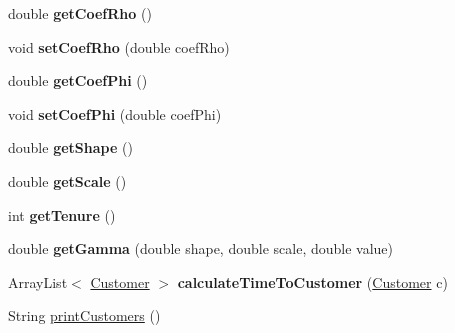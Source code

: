 \begin{DoxyCompactItemize}
\item 
double {\bfseries get\+Coef\+Rho} ()\hypertarget{classsvrptw_1_1_instance_aae3b14f91dcf261a7cc1595ccf4b28f2}{}\label{classsvrptw_1_1_instance_aae3b14f91dcf261a7cc1595ccf4b28f2}

\item 
void {\bfseries set\+Coef\+Rho} (double coef\+Rho)\hypertarget{classsvrptw_1_1_instance_aa7f091a84c61da2bcc82d7c18b584c2a}{}\label{classsvrptw_1_1_instance_aa7f091a84c61da2bcc82d7c18b584c2a}

\item 
double {\bfseries get\+Coef\+Phi} ()\hypertarget{classsvrptw_1_1_instance_ad633ca78e9fd4b0dbf75717a0d6e8fd0}{}\label{classsvrptw_1_1_instance_ad633ca78e9fd4b0dbf75717a0d6e8fd0}

\item 
void {\bfseries set\+Coef\+Phi} (double coef\+Phi)\hypertarget{classsvrptw_1_1_instance_a37d19e3afd8ac865a2981db262dda6a7}{}\label{classsvrptw_1_1_instance_a37d19e3afd8ac865a2981db262dda6a7}

\item 
double {\bfseries get\+Shape} ()\hypertarget{classsvrptw_1_1_instance_ac83ab9442287c82d2b949adfe69ed822}{}\label{classsvrptw_1_1_instance_ac83ab9442287c82d2b949adfe69ed822}

\item 
double {\bfseries get\+Scale} ()\hypertarget{classsvrptw_1_1_instance_a0474f885d2714b3c9959ee47a3131440}{}\label{classsvrptw_1_1_instance_a0474f885d2714b3c9959ee47a3131440}

\item 
int {\bfseries get\+Tenure} ()\hypertarget{classsvrptw_1_1_instance_a666f61a9030ab9fb70545b78818d59d2}{}\label{classsvrptw_1_1_instance_a666f61a9030ab9fb70545b78818d59d2}

\item 
double {\bfseries get\+Gamma} (double shape, double scale, double value)\hypertarget{classsvrptw_1_1_instance_aae5429a32987f36102d679ccd1c27ccc}{}\label{classsvrptw_1_1_instance_aae5429a32987f36102d679ccd1c27ccc}

\item 
Array\+List$<$ \hyperlink{classsvrptw_1_1_customer}{Customer} $>$ {\bfseries calculate\+Time\+To\+Customer} (\hyperlink{classsvrptw_1_1_customer}{Customer} c)\hypertarget{classsvrptw_1_1_instance_a8091731f13ceda855f8f9585c9467f20}{}\label{classsvrptw_1_1_instance_a8091731f13ceda855f8f9585c9467f20}

\item 
String \hyperlink{classsvrptw_1_1_instance_af92dbf426abb1f93b3f525fae1e7c80d}{print\+Customers} ()
\end{DoxyCompactItemize}

